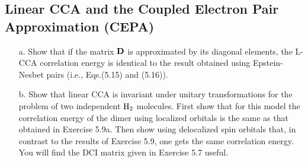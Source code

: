 \documentclass[a4paper]{book}
\newcounter{exercise}[chapter]
\newcommand{\D}{{\bf D}}
\begin{document}
	\subsection{Linear CCA and the Coupled Electron Pair Approximation (CEPA)}
	
	\begin{exercise}
	\begin{enumerate}
	
	\item[a.] Show that if the matrix $\D$ is approximated by its diagonal elements, the L-CCA correlation energy is identical to the result obtained using Epstein-Nesbet pairs (i.e., Eqs.(5.15) and (5.16)).
	
	\item[b.] Show that linear CCA is invariant under unitary transformations for the problem of two independent $\ce{H2}$ molecules. First show that for this model the correlation energy of the dimer using localized orbitals is the same as that obtained in Exercise 5.9a. Then show using delocalized spin orbitals that, in contrast to the results of Exercise 5.9, one gets the same correlation energy. You will find the DCI matrix given in Exercise 5.7 useful.
	
	\end{enumerate}
	
	\end{exercise}
		
\end{document}

